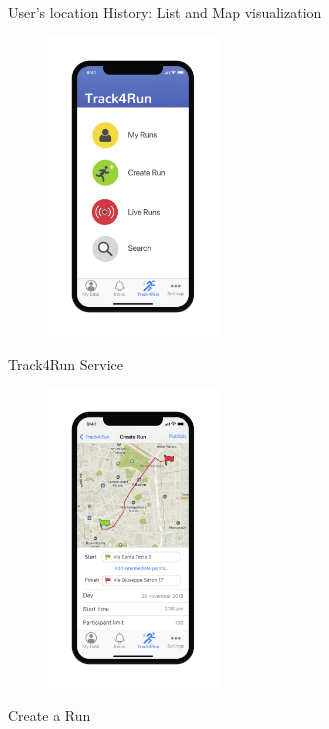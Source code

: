 \hspace*{1,5cm}User's location History: List and Map visualization



\begin{figure}[H]
    \centering
    \includegraphics[width=0.4\textwidth]{rasdL/Pictures/Mockup/mobile/track4run.png}

\end{figure}
\hspace*{5.5cm}Track4Run Service

\begin{figure}[H]
    \centering
    \includegraphics[width=0.4\textwidth]{rasdL/Pictures/Mockup/mobile/create_run.png}

\end{figure}
\hspace*{5.7cm}Create a Run

